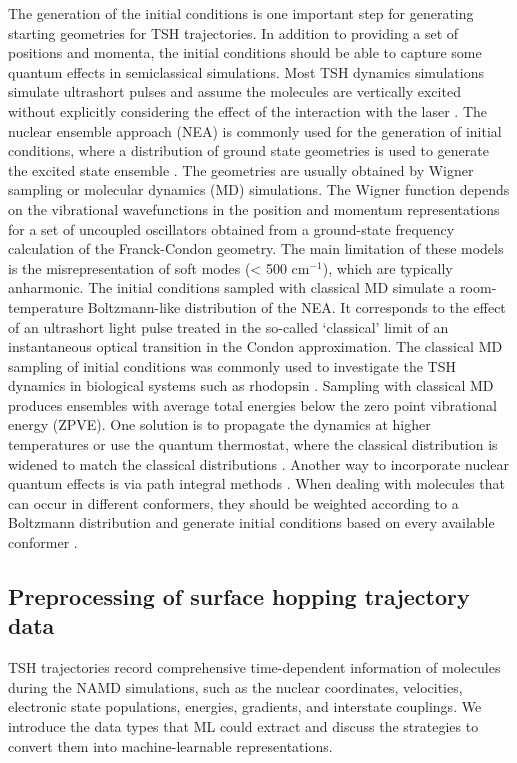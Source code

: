 \documentclass[9pt,bestpractices]{livecoms}
\begin{document}
The generation of the initial conditions is one important step for generating starting geometries for TSH trajectories. In addition to providing a set of positions and momenta, the initial conditions should be able to capture some quantum effects in semiclassical simulations.  Most TSH dynamics simulations simulate ultrashort pulses and assume the molecules are vertically excited without explicitly considering the effect of the interaction with the laser \cite{RN42}. The nuclear ensemble approach (NEA) is commonly used for the generation of initial conditions, where a distribution of ground state geometries is used to generate the excited state ensemble \cite{RN152, Srsen2020}. The geometries are usually obtained by Wigner sampling or molecular dynamics (MD) simulations. The Wigner function depends on the vibrational wavefunctions in the position and momentum representations for a set of uncoupled oscillators obtained from a ground-state frequency calculation of the Franck-Condon geometry. The main limitation of these models is the misrepresentation of soft modes (< 500 cm$^{-1}$), which are typically anharmonic. The initial conditions sampled with classical MD simulate a room-temperature Boltzmann-like distribution of the NEA. It corresponds to the effect of an ultrashort light pulse treated in the so-called ‘classical’ limit of an instantaneous optical transition in the Condon approximation. The classical MD sampling of initial conditions was commonly used to investigate the TSH dynamics in biological systems such as rhodopsin \cite{RN48}. Sampling with classical MD produces ensembles with average total energies below the zero point vibrational energy (ZPVE). One solution is to propagate the dynamics at higher temperatures or use the quantum thermostat, where the classical distribution is widened to match the classical distributions \cite{Ceriotti2010, RN42}. Another way to incorporate nuclear quantum effects is via path integral methods \cite{RN110, RN108, Ceriotti2011}. When dealing with molecules that can occur in different conformers, they should be weighted according to a Boltzmann distribution and generate initial conditions based on every available conformer \cite{RN104}.

\subsection{Preprocessing of surface hopping trajectory data}

TSH trajectories record comprehensive time-dependent information of molecules during the NAMD simulations, such as the nuclear coordinates, velocities, electronic state populations, energies, gradients, and interstate couplings. We introduce the data types that ML could extract and discuss the strategies to convert them into machine-learnable representations.
\end{document}
